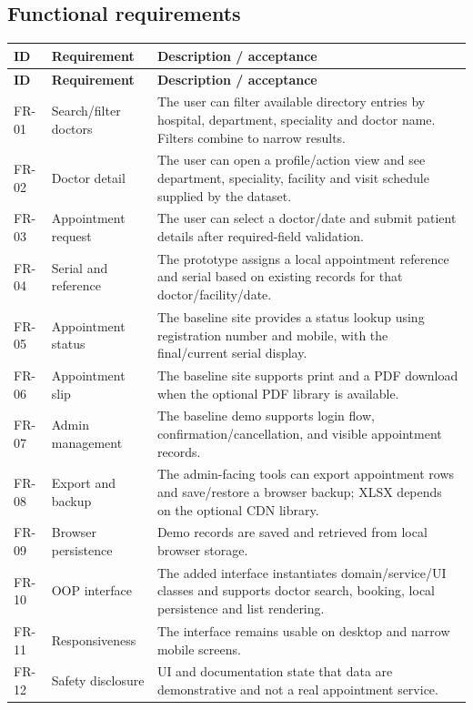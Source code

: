 \documentclass[11pt,a4paper]{article}
\begin{document}
\subsection{Functional requirements}
\small
\begin{longtable}{p{1.2cm}p{4.0cm}p{9.0cm}}
\toprule \textbf{ID} & \textbf{Requirement} & \textbf{Description / acceptance}\\\midrule
\endfirsthead
\toprule \textbf{ID} & \textbf{Requirement} & \textbf{Description / acceptance}\\\midrule
\endhead
FR-01 & Search/filter doctors & The user can filter available directory entries by hospital, department, speciality and doctor name. Filters combine to narrow results.\\
FR-02 & Doctor detail & The user can open a profile/action view and see department, speciality, facility and visit schedule supplied by the dataset.\\
FR-03 & Appointment request & The user can select a doctor/date and submit patient details after required-field validation.\\
FR-04 & Serial and reference & The prototype assigns a local appointment reference and serial based on existing records for that doctor/facility/date.\\
FR-05 & Appointment status & The baseline site provides a status lookup using registration number and mobile, with the final/current serial display.\\
FR-06 & Appointment slip & The baseline site supports print and a PDF download when the optional PDF library is available.\\
FR-07 & Admin management & The baseline demo supports login flow, confirmation/cancellation, and visible appointment records.\\
FR-08 & Export and backup & The admin-facing tools can export appointment rows and save/restore a browser backup; XLSX depends on the optional CDN library.\\
FR-09 & Browser persistence & Demo records are saved and retrieved from local browser storage.\\
FR-10 & OOP interface & The added interface instantiates domain/service/UI classes and supports doctor search, booking, local persistence and list rendering.\\
FR-11 & Responsiveness & The interface remains usable on desktop and narrow mobile screens.\\
FR-12 & Safety disclosure & UI and documentation state that data are demonstrative and not a real appointment service.\\
\bottomrule
\end{longtable}
\normalsize
\end{document}
